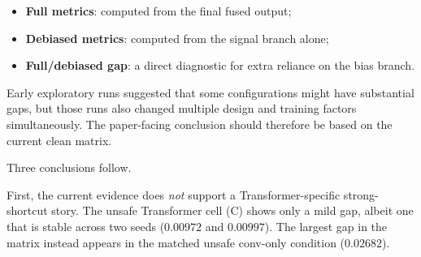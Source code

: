 \documentclass[11pt,a4paper]{article}
\begin{document}
\begin{itemize}[leftmargin=2em]
  \item \textbf{Full metrics}: computed from the final fused output;
  \item \textbf{Debiased metrics}: computed from the signal branch alone;
  \item \textbf{Full/debiased gap}: a direct diagnostic for extra
  reliance on the bias branch.
\end{itemize}

\noindent Early exploratory runs suggested that some configurations
might have substantial gaps, but those runs also changed multiple design
and training factors simultaneously. The paper-facing conclusion should
therefore be based on the current clean matrix.

\begin{table}[H]
\centering
\small
\caption{\textbf{Clean-matrix revalidation for bias reliance.} Under
explicit debiased supervision, both TF and conv-only scaffolds remain
clean. Under the unsafe setting (\texttt{sg=true, deb0}), the
Transformer cell shows only a mild and stable gap across two seeds,
whereas the matched conv-only cell shows the largest gap in the matrix.}
\label{tab:shortcut}
\end{table}

\noindent Three conclusions follow.

First, the current evidence does \emph{not} support a
Transformer-specific strong-shortcut story. The unsafe Transformer cell
(C) shows only a mild gap, albeit one that is stable across two seeds
(\(0.00972\) and \(0.00997\)). The largest gap in the matrix instead
appears in the matched unsafe conv-only condition (\(0.02682\)).
\end{document}
